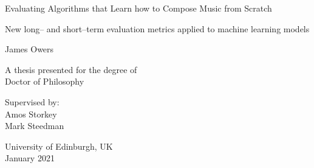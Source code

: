 \documentclass[12pt,a4paper,]{report}
\begin{document}
\begin{titlepage}
    \begin{center}


        \vspace*{2.5cm}

        \huge
        Evaluating Algorithms that Learn how to Compose Music from
        Scratch

                \vspace{.5cm}

        \Large
        New long-- and short--term evaluation metrics applied to machine
        learning models
        

        \vspace{1.5cm}

        \Large
        James Owers

        \vspace{1.5cm}

        \normalsize
        A thesis presented for the degree of\\
        Doctor of Philosophy

        \vfill

        \normalsize
        Supervised by:\\
        Amos Storkey \\ Mark Steedman

        \vspace{0.8cm}


        \normalsize
        University of Edinburgh, UK\\
        January 2021


    \end{center}
\end{titlepage}


\vspace*{\fill}
\end{document}
